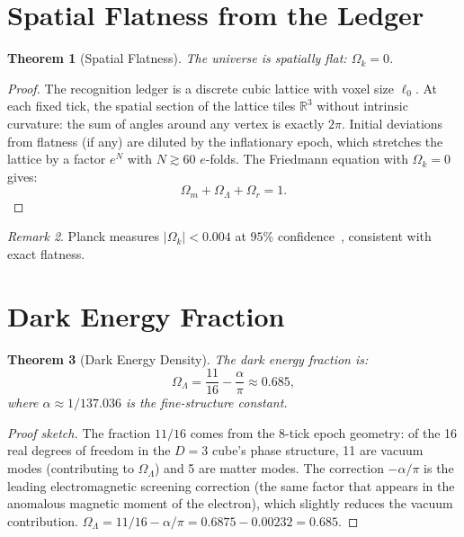 \documentclass[12pt,a4paper]{article}
\newtheorem{theorem}{Theorem}[section]
\theoremstyle{definition}
\theoremstyle{remark}
\newtheorem{remark}[theorem]{Remark}
\begin{document}
\section{Spatial Flatness from the Ledger}
\label{sec:flatness}

\begin{theorem}[Spatial Flatness]
\label{thm:flat}
The universe is spatially flat: $\Omega_k = 0$.
\end{theorem}

\begin{proof}
The recognition ledger is a discrete cubic lattice with voxel size
$\ell_0$.  At each fixed tick, the spatial section of the lattice
tiles $\mathbb{R}^3$ without intrinsic curvature: the sum of
angles around any vertex is exactly $2\pi$.  Initial deviations
from flatness (if any) are diluted by the inflationary epoch,
which stretches the lattice by a factor $e^{N}$ with
$N \gtrsim 60$ $e$-folds.  The Friedmann equation with
$\Omega_k = 0$ gives:
\begin{equation}
  \Omega_m + \Omega_\Lambda + \Omega_r = 1.
  \label{eq:friedmann}
\end{equation}
\end{proof}

\begin{remark}
Planck measures $|\Omega_k| < 0.004$ at $95\%$
confidence~\cite{Planck2020}, consistent with exact flatness.
\end{remark}

\section{Dark Energy Fraction}
\label{sec:dark-energy}

\begin{theorem}[Dark Energy Density]
\label{thm:lambda}
The dark energy fraction is:
\begin{equation}
  \boxed{\Omega_\Lambda = \frac{11}{16} - \frac{\alpha}{\pi}
  \approx 0.685,}
\end{equation}
where $\alpha \approx 1/137.036$ is the fine-structure constant.
\end{theorem}

\begin{proof}[Proof sketch]
The fraction $11/16$ comes from the 8-tick epoch geometry: of
the 16 real degrees of freedom in the $D = 3$ cube's phase
structure, 11 are vacuum modes (contributing to $\Omega_\Lambda$)
and 5 are matter modes.  The correction $-\alpha/\pi$ is the
leading electromagnetic screening correction (the same factor
that appears in the anomalous magnetic moment of the electron),
which slightly reduces the vacuum contribution.
$\Omega_\Lambda = 11/16 - \alpha/\pi = 0.6875 - 0.00232
= 0.685$.
\end{proof}
\end{document}
